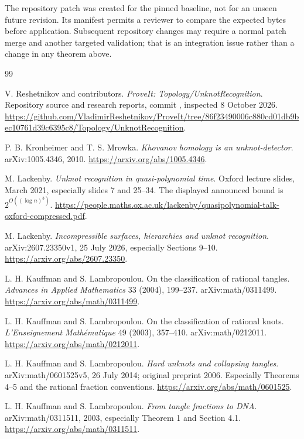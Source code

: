 \documentclass[11pt,a4paper]{article}
\theoremstyle{definition}
\theoremstyle{remark}
\newcommand{\code}[1]{\texttt{\detokenize{#1}}}
\numberwithin{equation}{section}
\begin{document}
The repository patch was created for the pinned baseline, not for an
unseen future revision. Its manifest permits a reviewer to compare the
expected bytes before application. Subsequent repository changes may
require a normal patch merge and another targeted validation; that is
an integration issue rather than a change in any theorem above.

\begin{thebibliography}{99}
\small\raggedright

V. Reshetnikov and contributors.
\emph{ProveIt: Topology/UnknotRecognition}.
Repository source and research reports, commit
\code{86f23490006c880cd01db9bec10761d39c6395c8},
inspected 8 October 2026.
\url{https://github.com/VladimirReshetnikov/ProveIt/tree/86f23490006c880cd01db9bec10761d39c6395c8/Topology/UnknotRecognition}.

P. B. Kronheimer and T. S. Mrowka.
\emph{Khovanov homology is an unknot-detector}.
arXiv:1005.4346, 2010.
\url{https://arxiv.org/abs/1005.4346}.

M. Lackenby.
\emph{Unknot recognition in quasi-polynomial time}.
Oxford lecture slides, March 2021, especially slides 7 and 25--34.
The displayed announced bound is \(2^{O((\log n)^3)}\).
\url{https://people.maths.ox.ac.uk/lackenby/quasipolynomial-talk-oxford-compressed.pdf}.

M. Lackenby.
\emph{Incompressible surfaces, hierarchies and unknot recognition}.
arXiv:2607.23350v1, 25 July 2026, especially Sections 9--10.
\url{https://arxiv.org/abs/2607.23350}.

L. H. Kauffman and S. Lambropoulou.
On the classification of rational tangles.
\emph{Advances in Applied Mathematics} 33 (2004), 199--237.
arXiv:math/0311499.
\url{https://arxiv.org/abs/math/0311499}.

L. H. Kauffman and S. Lambropoulou.
On the classification of rational knots.
\emph{L'Enseignement Math\'ematique} 49 (2003), 357--410.
arXiv:math/0212011.
\url{https://arxiv.org/abs/math/0212011}.

L. H. Kauffman and S. Lambropoulou.
\emph{Hard unknots and collapsing tangles}.
arXiv:math/0601525v5, 26 July 2014; original preprint 2006.
Especially Theorems 4--5 and the rational fraction conventions.
\url{https://arxiv.org/abs/math/0601525}.

L. H. Kauffman and S. Lambropoulou.
\emph{From tangle fractions to DNA}.
arXiv:math/0311511, 2003, especially Theorem 1 and Section 4.1.
\url{https://arxiv.org/abs/math/0311511}.


\end{thebibliography}
\end{document}

